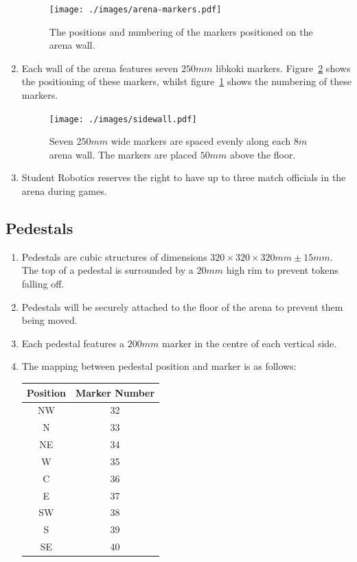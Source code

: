 \begin{enumerate}
\begin{figure}
  \centering
  \texttt{[image: ./images/arena-markers.pdf]}
  \caption{The positions and numbering of the markers positioned on the arena wall.}
  \label{fig:arena-zones}
\end{figure}

\item Each wall of the arena features seven $250mm$ libkoki markers.
      Figure~\ref{fig:arena-wall} shows the positioning of these markers, whilst figure~\ref{fig:arena-zones} shows the numbering of these markers.

\begin{figure}
  \centering
  \texttt{[image: ./images/sidewall.pdf]}
  \caption{Seven $250mm$ wide markers are spaced evenly along each $8m$ arena wall.
           The markers are placed $50mm$ above the floor.}
  \label{fig:arena-wall}
\end{figure}

\item Student Robotics reserves the right to have up to three match officials in the arena during games.

\end{enumerate}

\subsection{Pedestals}
\label{sub:pedestals}
\begin{enumerate}
\item Pedestals are cubic structures of dimensions $320 \times 320 \times 320mm \pm 15mm$.
      The top of a pedestal is surrounded by a $20mm$ high rim to prevent tokens falling off.

\item Pedestals will be securely attached to the floor of the arena to prevent them being moved.

\item Each pedestal features a $200mm$ marker in the centre of each vertical side.

\item The mapping between pedestal position and marker is as follows:

\begin{center}
  \begin{tabular}{cc}
    \toprule
    \textbf{Position} & \textbf{Marker Number} \\
    \midrule
    NW & 32 \\
    N  & 33 \\
    NE & 34 \\
    W  & 35 \\
    C  & 36 \\
    E  & 37 \\
    SW & 38 \\
    S  & 39 \\
    SE & 40 \\
    \bottomrule
  \end{tabular}
\end{center}

\end{enumerate}

